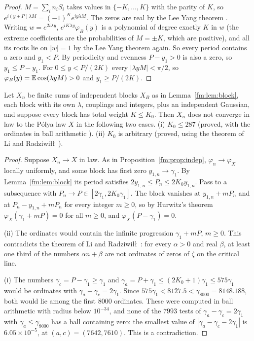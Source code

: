 \begin{proof}
$M=\sum_in_iS_i$ takes values in $\{-K,\dots,K\}$ with the parity of $K$, so $e^{i(y+P)\lambda M}=(-1)^Ke^{iy\lambda M}$. The zeros are real by the Lee Yang theorem \cite{LeeYang}. Writing $w=e^{2i\lambda y}$, $e^{iK\lambda y}\varphi_B(y)$ is a polynomial of degree exactly $K$ in $w$ (the extreme coefficients are the probabilities of $M=\pm K$, which are positive), and all its roots lie on $|w|=1$ by the Lee Yang theorem again. So every period contains a zero and $y_1<P$. By periodicity and evenness $P-y_1>0$ is also a zero, so $y_1\le P-y_1$. For $0\le y<P/(2K)$ every $|\lambda yM|<\pi/2$, so $\varphi_B(y)=\mathbb{E}\cos(\lambda yM)>0$ and $y_1\ge P/(2K)$.
\end{proof}

\begin{theorem}\label{fm:thm:blocks}
Let $X_n$ be finite sums of independent blocks $X_B$ as in Lemma~\ref{fm:lem:block}, each block with its own $\lambda$, couplings and integers, plus an independent Gaussian, and suppose every block has total weight $K\le K_0$. Then $X_n$ does not converge in law to the P\'olya law $X$ in the following two cases. (i) $K_0\le287$ (proved, with the ordinates in ball arithmetic \cite{Arb}). (ii) $K_0$ is arbitrary (proved, using the theorem of Li and Radziwi\l\l\ \cite{LiRad15}).
\end{theorem}

\begin{proof}
Suppose $X_n\to X$ in law. As in Proposition~\ref{fm:prop:indep}, $\varphi_n\to\varphi_X$ locally uniformly, and some block has first zero $y_{1,n}\to\gamma_1$. By Lemma~\ref{fm:lem:block} its period satisfies $2y_{1,n}\le P_n\le2K_0y_{1,n}$. Pass to a subsequence with $P_n\to P\in[2\gamma_1,2K_0\gamma_1]$. The block vanishes at $y_{1,n}+mP_n$ and at $P_n-y_{1,n}+mP_n$ for every integer $m\ge0$, so by Hurwitz's theorem $\varphi_X(\gamma_1+mP)=0$ for all $m\ge0$, and $\varphi_X(P-\gamma_1)=0$.

(ii) The ordinates would contain the infinite progression $\gamma_1+mP$, $m\ge0$. This contradicts the theorem of Li and Radziwi\l\l\ \cite{LiRad15}: for every $\alpha>0$ and real $\beta$, at least one third of the numbers $\alpha n+\beta$ are not ordinates of zeros of $\zeta$ on the critical line.

(i) The numbers $\gamma_c=P-\gamma_1\ge\gamma_1$ and $\gamma_a=P+\gamma_1\le(2K_0+1)\gamma_1\le575\gamma_1$ would be ordinates with $\gamma_a-\gamma_c=2\gamma_1$. Since $575\gamma_1<8127.5<\gamma_{8000}=8148.188$, both would lie among the first $8000$ ordinates. These were computed in ball arithmetic with radius below $10^{-34}$, and none of the $7993$ tests of $\gamma_a-\gamma_c=2\gamma_1$ with $\gamma_a\le\gamma_{8000}$ has a ball containing zero: the smallest value of $|\gamma_a-\gamma_c-2\gamma_1|$ is $6.05\times10^{-5}$, at $(a,c)=(7642,7610)$. This is a contradiction.
\end{proof}

